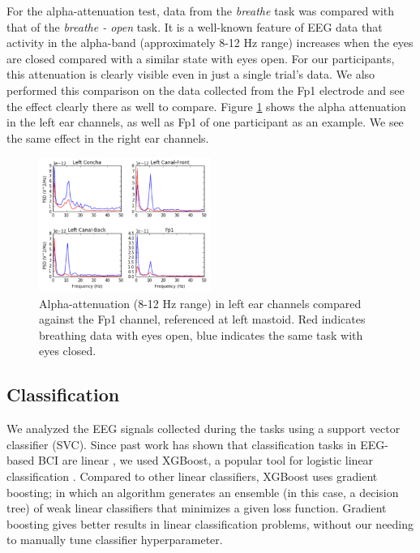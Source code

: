 \documentclass{sigchi}
\begin{document}
For the alpha-attenuation test, data from the \textit{breathe} task was compared with that of the \textit{breathe - open} task. It is a well-known feature of EEG data that activity in the alpha-band (approximately 8-12 Hz range) increases when the eyes are closed compared with a similar state with eyes open. For our participants, this attenuation is clearly visible even in just a single trial's data. We also performed this comparison on the data collected from the Fp1 electrode and see the effect clearly there as well to compare. Figure \ref{fig:alpha_atten} shows the alpha attenuation in the left ear channels, as well as Fp1 of one participant as an example. We see the same effect in the right ear channels.

\begin{figure}[h]
\centering
\includegraphics[width=0.5\textwidth]{figures/002_AlphaAtt_all.jpg}
\caption{Alpha-attenuation (8-12 Hz range) in left ear channels compared against the Fp1 channel, referenced at left mastoid. Red indicates breathing data with eyes open, blue indicates the same task with eyes closed.}
\label{fig:alpha_atten}
\end{figure}

\subsection{Classification}

We analyzed the EEG signals collected during the tasks using a support vector classifier (SVC). Since past work has shown that classification tasks in EEG-based BCI are linear \cite{Garrett2003a}, we used XGBoost, a popular tool for logistic linear classification \cite{Chen2016}. Compared to other linear classifiers, XGBoost uses gradient boosting; in which an algorithm generates an ensemble (in this case, a decision tree) of weak linear classifiers that minimizes a given loss function. Gradient boosting gives better results in linear classification problems, without our needing to manually tune classifier hyperparameter.
\end{document}
